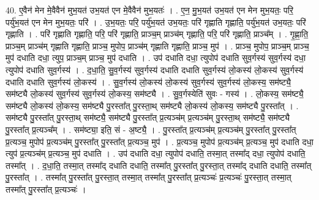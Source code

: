 \documentclass[17pt]{extarticle}
\begin{document}
40. ए॒वैन॑ मेन मे॒वैवैन॑ मुभ॒यत॑ उभ॒यत॑ एन मे॒वैवैन॑ मुभ॒यतः॑ । . ए॒न॒ मु॒भ॒यत॑ उभ॒यत॑ एन मेन मुभ॒यतः॒ परि॒ पर्यु॑भ॒यत॑ एन मेन मुभ॒यतः॒ परि॑ । . उ॒भ॒यतः॒ परि॒ पर्यु॑भ॒यत॑ उभ॒यतः॒ परि॑ गृह्णाति गृह्णाति॒ पर्यु॑भ॒यत॑ उभ॒यतः॒ परि॑ गृह्णाति । . परि॑ गृह्णाति गृह्णाति॒ परि॒ परि॑ गृह्णाति॒ प्राञ्च॒म् प्राञ्च॑म् गृह्णाति॒ परि॒ परि॑ गृह्णाति॒ प्राञ्च᳚म् । . गृ॒ह्णा॒ति॒ प्राञ्च॒म् प्राञ्च॑म् गृह्णाति गृह्णाति॒ प्राञ्च॒ मुपोप॒ प्राञ्च॑म् गृह्णाति गृह्णाति॒ प्राञ्च॒ मुप॑ । . प्राञ्च॒ मुपोप॒ प्राञ्च॒म् प्राञ्च॒ मुप॑ दधाति दधा॒ त्युप॒ प्राञ्च॒म् प्राञ्च॒ मुप॑ दधाति । . उप॑ दधाति दधा॒ त्युपोप॑ दधाति सुव॒र्गस्य॑ सुव॒र्गस्य॑ दधा॒ त्युपोप॑ दधाति सुव॒र्गस्य॑ । . द॒धा॒ति॒ सु॒व॒र्गस्य॑ सुव॒र्गस्य॑ दधाति दधाति सुव॒र्गस्य॑ लो॒कस्य॑ लो॒कस्य॑ सुव॒र्गस्य॑ दधाति दधाति सुव॒र्गस्य॑ लो॒कस्य॑ । . सु॒व॒र्गस्य॑ लो॒कस्य॑ लो॒कस्य॑ सुव॒र्गस्य॑ सुव॒र्गस्य॑ लो॒कस्य॒ सम॑ष्ट्यै॒ सम॑ष्ट्यै लो॒कस्य॑ सुव॒र्गस्य॑ सुव॒र्गस्य॑ लो॒कस्य॒ सम॑ष्ट्यै । . सु॒व॒र्गस्येति॑ सुवः - गस्य॑ । . लो॒कस्य॒ सम॑ष्ट्यै॒ सम॑ष्ट्यै लो॒कस्य॑ लो॒कस्य॒ सम॑ष्ट्यै पु॒रस्ता᳚त् पु॒रस्ता॒थ् सम॑ष्ट्यै लो॒कस्य॑ लो॒कस्य॒ सम॑ष्ट्यै पु॒रस्ता᳚त् । . सम॑ष्ट्यै पु॒रस्ता᳚त् पु॒रस्ता॒थ् सम॑ष्ट्यै॒ सम॑ष्ट्यै पु॒रस्ता᳚त् प्र॒त्यञ्च॑म् प्र॒त्यञ्च॑म् पु॒रस्ता॒थ् सम॑ष्ट्यै॒ सम॑ष्ट्यै पु॒रस्ता᳚त् प्र॒त्यञ्च᳚म् । . सम॑ष्ट्या॒ इति॒ सं - अ॒ष्ट्यै॒ । . पु॒रस्ता᳚त् प्र॒त्यञ्च॑म् प्र॒त्यञ्च॑म् पु॒रस्ता᳚त् पु॒रस्ता᳚त् प्र॒त्यञ्च॒ मुपोप॑ प्र॒त्यञ्च॑म् पु॒रस्ता᳚त् पु॒रस्ता᳚त् प्र॒त्यञ्च॒ मुप॑ । . प्र॒त्यञ्च॒ मुपोप॑ प्र॒त्यञ्च॑म् प्र॒त्यञ्च॒ मुप॑ दधाति दधा॒ त्युप॑ प्र॒त्यञ्च॑म् प्र॒त्यञ्च॒ मुप॑ दधाति । . उप॑ दधाति दधा॒ त्युपोप॑ दधाति॒ तस्मा॒त् तस्मा᳚द् दधा॒ त्युपोप॑ दधाति॒ तस्मा᳚त् । . द॒धा॒ति॒ तस्मा॒त् तस्मा᳚द् दधाति दधाति॒ तस्मा᳚त् पु॒रस्ता᳚त् पु॒रस्ता॒त् तस्मा᳚द् दधाति दधाति॒ तस्मा᳚त् पु॒रस्ता᳚त् । . तस्मा᳚त् पु॒रस्ता᳚त् पु॒रस्ता॒त् तस्मा॒त् तस्मा᳚त् पु॒रस्ता᳚त् प्र॒त्यञ्चः॑ प्र॒त्यञ्चः॑ पु॒रस्ता॒त् तस्मा॒त् तस्मा᳚त् पु॒रस्ता᳚त् प्र॒त्यञ्चः॑ । \newline
\pagebreak
{}
\end{document}

